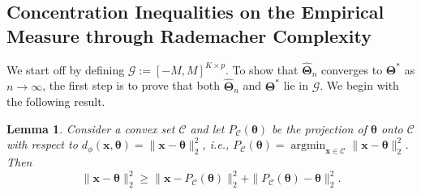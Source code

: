 \documentclass{article}
\newtheorem{lemma}{Lemma}[section]
\begin{document}



\subsection{Concentration Inequalities on the Empirical Measure through Rademacher Complexity}

We start off by defining $\mathscr{G} := [-M,M]^{K \times p}$. To show that $\displaystyle \widehat{\bm{\Theta}}_n$ converges to $\bm{\Theta}^*$ as $n \to \infty$, the first step is to prove that both $\widehat{\bm{\Theta}}_n$ and $\displaystyle \bm{\Theta}^*$ lie in $\mathscr{G}$. We begin with the following result.


\begin{lemma}\label{lemma-1-obtuse}
    Consider a convex set $\mathcal{C}$ and let $P_{\mathcal{C}}(\bm{\theta})$ be the projection of $\bm{\theta}$ onto $\mathcal{C}$ with respect to $d_{\phi}(\bm{x},\bm{\theta})=\|\bm{x}-\bm{\theta}\|_2^2$, i.e., $P_\mathcal{C}(\bm{\theta})=\operatorname{argmin}_{\bm{x}\in \mathcal{C}}\|\bm{x}-\bm{\theta}\|_2^2$. Then \[\|\bm{x}-\bm{\theta}\|_2^2\ge \|\bm{x}-P_{\mathcal{C}}(\bm{\theta})\|_2^2+\|P_{\mathcal{C}}(\bm{\theta})-\bm{\theta}\|_2^2.\]
\end{lemma}
\end{document}
